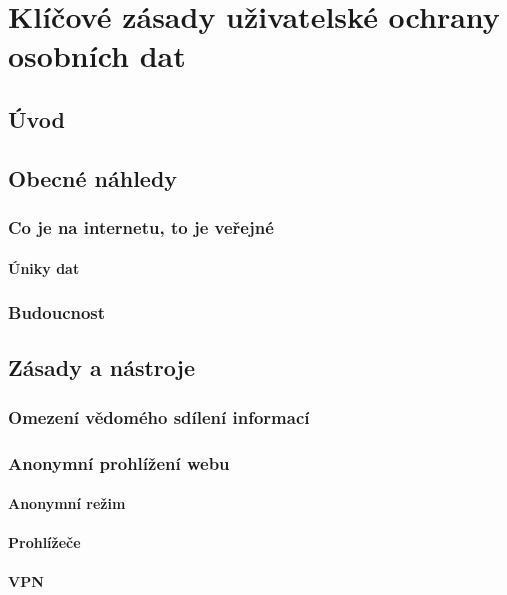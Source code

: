 \chapter{Klíčové zásady uživatelské ochrany osobních dat}

\section*{Úvod}

\section{Obecné náhledy}

\subsection{Co je na internetu, to je veřejné}
\subsubsection{Úniky dat}

\subsection{Budoucnost}

\section{Zásady a nástroje}

\subsection{Omezení vědomého sdílení informací}

\subsection{Anonymní prohlížení webu}
\subsubsection{Anonymní režim}
\subsubsection{Prohlížeče}
\subsubsection{VPN}
